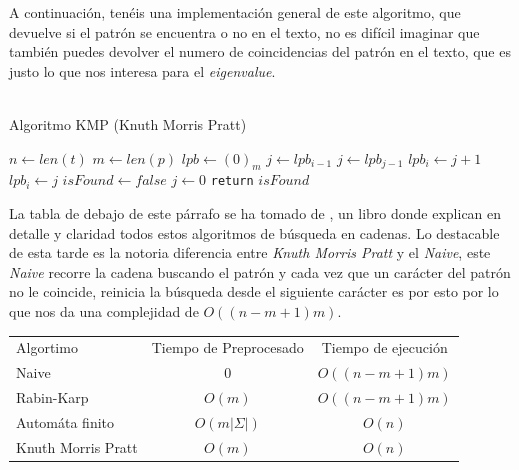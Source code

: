 A continuación, tenéis una implementación general de este algoritmo, que devuelve si el patrón se encuentra o no en el texto, no es difícil imaginar que también puedes devolver el numero de coincidencias del patrón en el texto, que es justo lo que nos interesa para el \textit{eigenvalue}.\\\\
\newpage
\begin{algorithm}
\caption{Algoritmo KMP (Knuth Morris Pratt)}\label{alg:four}
$n \gets len(t)$\;
$m \gets len(p)$\;
$lpb \gets (0)_m$\;
 {
    $j \gets lpb_{i-1}$\;
     {
        $j \gets lpb_{j-1}$\;
         {
            $lpb_i \gets j+1$\;
        }
        {
        $lpb_i \gets j$\;
        }
    }
}
$isFound \gets false$\;
$j \gets 0$\;
\texttt{return} $isFound$\;
\end{algorithm}
La tabla de debajo de este párrafo se ha tomado de \cite{leiserson2022introduction}, un libro donde explican en detalle y claridad todos estos algoritmos de búsqueda en cadenas. Lo destacable de esta tarde es la notoria diferencia entre \textit{Knuth Morris Pratt} y el \textit{Naive}, este \textit{Naive} recorre la cadena buscando el patrón y cada vez que un carácter del patrón no le coincide, reinicia la búsqueda desde el siguiente carácter es por esto por lo que nos da una complejidad de $O((n-m+1)m)$. 
\begin{center}
\begin{tabular}{ l c c }
 Algortimo & Tiempo de Preprocesado & Tiempo de ejecución \\ \cline{1-3}
 Naive & 0 & $O((n-m+1)m)$ \\  
 Rabin-Karp & $O(m)$ & $O((n-m+1)m)$ \\
 Automáta finito & $O(m|\Sigma|)$ & $O(n)$ \\
 Knuth Morris Pratt & $O(m)$ & $O(n)$
\end{tabular}
\end{center}

